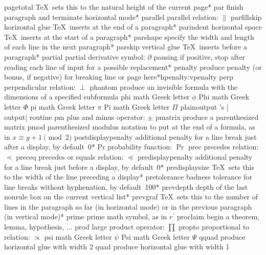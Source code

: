 \capcs pagetotal {\TeX\ sets this to the natural height of the current
   page}*{}
\capcs par {finish paragraph and terminate horizontal mode}*{\@par}
\capcs parallel {parallel relation: $\parallel$}{}{}
\capcs parfillskip {horizontal glue \TeX\ inserts at the end of a
   paragraph}*{}
\capcs parindent {horizontal space \TeX\ inserts at the start of a
   paragraph}*{}
\capcs parshape {specify the width and length of each line 
   in the next paragraph}*{}
\capcs parskip {vertical glue \TeX\ inserts before a paragraph}*{}
\capcs partial {partial derivative symbol: $\partial$}{}{}
\capcs pausing {if positive, stop after reading each line of input for a
   possible replacement}*{}
\capcstwo penalty {produce penalty (or bonus, if negative) for breaking
   line or page here}*{hpenalty:vpenalty}
\capcs perp {perpendicular relation: $\perp$}{}{}
\capcs phantom {produce an invisible formula with the 
   dimensions of a specified subformula}{}{}
\capcs phi {math Greek letter $\phi$}{}{}
\capcs Phi {math Greek letter $\Phi$}{}{}
\capcs pi {math Greek letter $\pi$}{}{}
\capcs Pi {math Greek letter $\Pi$}{}{}
\capcs plainoutput {\plainTeX's |\\output| routine}{}{}
\capcs pm {plus and minus operator: $\pm$}{}{}
\capcs pmatrix {produce a parenthesized matrix}{}{}
\capcs pmod {parenthesized modulus notation to put at the end of a formula, as
   in $x \equiv y+1 \pmod 2$}{}{}
\capcs postdisplaypenalty {additional penalty for a line break
   just after a display, by default~0}*{}
\capcs Pr {probability function: $\Pr$}{}{}
\capcs prec {precedes relation: $\prec$}{}{}
\capcs preceq {precedes or equals relation: $\preceq$}{}{}
\capcs predisplaypenalty {additional penalty for a line break just 
   before a display, by default~0}*{}
\capcs predisplaysize {\TeX\ sets this to the width of the
   line preceding a display}*{}
\capcs pretolerance {badness tolerance for line breaks without
   hyphenation, by default~100}*{}
\capcs prevdepth {depth of the last nonrule box on the
   current vertical list}*{}
\capcs prevgraf {\TeX\ sets this to the number
   of lines in the paragraph so far (in horizontal mode)
   or in the previous paragraph (in vertical mode)}*{}
\capcs prime {prime math symbol, as in $r^\prime$}{}{}
\capcs proclaim {begin a theorem, lemma, hypothesis, $\ldots$}{}{\@proclaim}
\capcs prod {large product operator: $\prod$}{}{}
\capcs propto {proportional to relation: $\propto$}{}{}
\capcs psi {math Greek letter $\psi$}{}{}
\capcs Psi {math Greek letter $\Psi$}{}{}
\capcs qquad {produce horizontal glue with width 2\em}{}{}
\capcs quad {produce horizontal glue with width 1\em}{}{}
